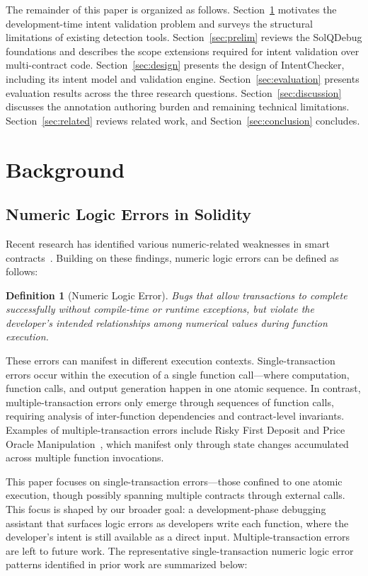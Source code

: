 \documentclass[pdflatex,sn-basic]{sn-jnl}%
\theoremstyle{thmstyleone}%
\theoremstyle{thmstyletwo}%
\theoremstyle{thmstylethree}%
\newtheorem{definition}{Definition}%
\begin{document}
The remainder of this paper is organized as follows.
Section~\ref{sec:background} motivates the development-time intent validation problem and surveys the structural limitations of existing detection tools.
Section~\ref{sec:prelim} reviews the SolQDebug foundations and describes the scope extensions required for intent validation over multi-contract code.
Section~\ref{sec:design} presents the design of IntentChecker, including its intent model and validation engine.
Section~\ref{sec:evaluation} presents evaluation results across the three research questions.
Section~\ref{sec:discussion} discusses the annotation authoring burden and remaining technical limitations.
Section~\ref{sec:related} reviews related work, and Section~\ref{sec:conclusion} concludes.

\section{Background}\label{sec:background}
\subsection{Numeric Logic Errors in Solidity}

Recent research has identified various numeric-related weaknesses in smart contracts~\citep{numscout,gptscan,flyinointment,exploitablebugs,defiattacks}.
Building on these findings, numeric logic errors can be defined as follows:

\begin{definition}[Numeric Logic Error]
Bugs that allow transactions to complete successfully without compile-time or runtime exceptions,
but violate the developer's intended relationships among numerical values during function execution.
\end{definition}

These errors can manifest in different execution contexts.
Single-transaction errors occur within the execution of a single function call---where computation, function calls, and output generation happen in one atomic sequence.
In contrast, multiple-transaction errors only emerge through sequences of function calls, requiring analysis of inter-function dependencies and contract-level invariants.
Examples of multiple-transaction errors include Risky First Deposit and Price Oracle Manipulation~\citep{gptscan, exploitablebugs}, which manifest only through state changes accumulated across multiple function invocations.

This paper focuses on single-transaction errors---those confined to one atomic execution, though possibly spanning multiple contracts through external calls. This focus is shaped by our broader goal: a development-phase debugging assistant that surfaces logic errors as developers write each function, where the developer's intent is still available as a direct input. Multiple-transaction errors are left to future work.
The representative single-transaction numeric logic error patterns identified in prior work are summarized below:
\end{document}
